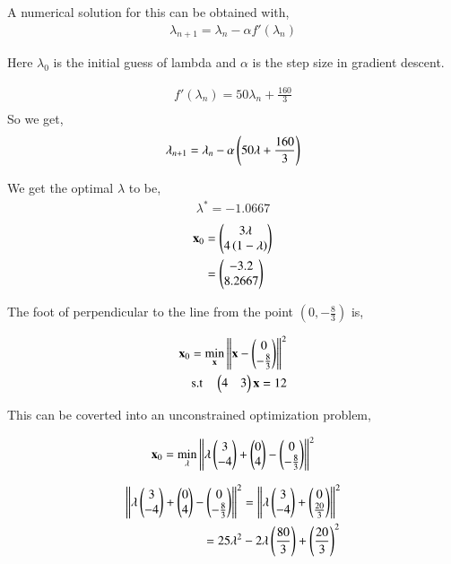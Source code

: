 \documentclass[journal,12pt,twocolumn]{IEEEtran}
\begin{document}
\begin{enumerate}
A numerical solution for this can be obtained with,
		\begin{align}
			\lambda_{n+1} = \lambda_n - \alpha f'(\lambda_n)
		\end{align}

Here $\lambda_0$ is the initial guess of lambda and $\alpha$ is the step size in gradient descent.

		\begin{align}
			f'(\lambda_n) = 50\lambda_n+\frac{160}{3}\\
		\end{align}
So we get,
		\begin{align}
			\lambda_{n+1} = \lambda_n - \alpha \left(50\lambda+\frac{160}{3}\right) 
		\end{align}

We get the optimal $\lambda$ to be,
		\begin{align}
			\lambda^* = -1.0667
		\end{align}
\begin{align}
	\mathbf{x}_0 &= \begin{pmatrix}3\lambda\\4\left(1-\lambda\right)\end{pmatrix}\\
		  &=\begin{pmatrix}-3.2\\8.2667\end{pmatrix}
\end{align}

		\begin{table}[h]
			\centering
			
			\caption{}
			\label{tab:1}
		\end{table}
		
The foot of perpendicular to the line from the point $(0,-\frac{8}{3})$ is,

		\begin{align}
			\mathbf{x}_0 = \min_{\mathbf{x}} \left\lVert\mathbf{x}-\begin{pmatrix}0\\-\frac{8}{3}\end{pmatrix}\right\rVert^2\\
			\text{s.t} \quad \begin{pmatrix}4 & 3\end{pmatrix}\mathbf{x} = 12
		\end{align}

This can be coverted into an unconstrained optimization problem,
	
		\begin{align}
			\mathbf{x}_0 = \min_{\mathbf{\lambda}} \left\lVert\lambda \begin{pmatrix}3\\-4\end{pmatrix}+\begin{pmatrix}0\\4\end{pmatrix}-\begin{pmatrix}0\\-\frac{8}{3}\end{pmatrix}\right\rVert^2\\
		\end{align}

		\begin{align}
			\left\lVert\lambda \begin{pmatrix}3\\-4\end{pmatrix}+\begin{pmatrix}0\\4\end{pmatrix}-\begin{pmatrix}0\\-\frac{8}{3}\end{pmatrix}\right\rVert^2&= \left\lVert\lambda \begin{pmatrix}3\\-4\end{pmatrix}+\begin{pmatrix}0\\\frac{20}{3}\end{pmatrix}\right\rVert^2\\
			= 25\lambda^2 &-2\lambda \left(\frac{80}{3}\right)+\left(\frac{20}{3}\right)^2
		\end{align}


\end{enumerate}
\end{document}
